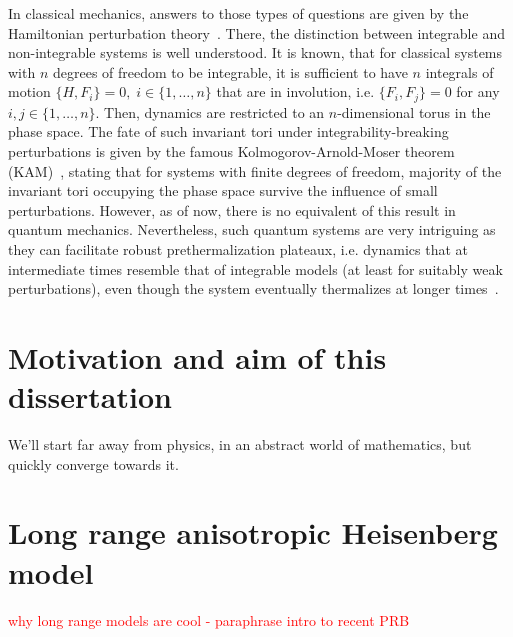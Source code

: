 In classical mechanics, answers to those types of questions are given by the Hamiltonian perturbation
theory~\autocite{arnold2013mathematical}. There, the distinction between integrable and non-integrable systems is
well understood. It is known, that for classical systems with \(n\) degrees of freedom
to be integrable, it is sufficient to have \(n\) integrals of motion \(\{H,F_i\} = 0,\; i \in \{1,\ldots,n\} \) that
are in involution, i.e. \(\{F_i,F_j\} = 0\) for any \(i,j\in\{1,\ldots,n\}\). Then, dynamics are restricted to an \(n\)-dimensional
torus in the phase space. The fate of such invariant tori under integrability-breaking perturbations is given by the
famous Kolmogorov-Arnold-Moser theorem (KAM)~\autocite{Kolmogorov1954,Arnold1963,Moser1962}, stating that for systems
with finite degrees of freedom, majority of the invariant tori occupying the phase space survive the influence of small 
perturbations. However, as of now, there is no equivalent of this result in quantum mechanics.
Nevertheless, such quantum systems are very intriguing as they can facilitate robust
prethermalization plateaux, i.e. dynamics that at intermediate times resemble that of integrable models
(at least for suitably weak perturbations), even though the system eventually thermalizes at longer
times~\autocite{mallayya2019,Bertini2015,Berges2004,Langen2016}.


\section{Motivation and aim of this dissertation}
We'll start far away from physics, in an abstract world of mathematics, but quickly converge towards it.
\section{Long range anisotropic Heisenberg model}
\textcolor{red}{why long range models are cool - paraphrase intro to recent PRB}